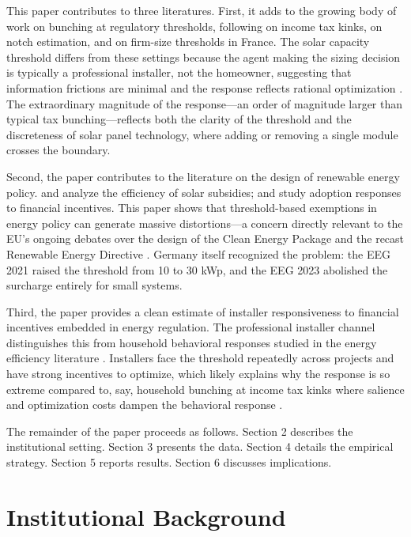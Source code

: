 \documentclass[12pt]{article}
\begin{document}
This paper contributes to three literatures. First, it adds to the growing body of work on bunching at regulatory thresholds, following \citet{saez2010taxpayers} on income tax kinks, \citet{kleven2013using} on notch estimation, and \citet{garicano2016firm} on firm-size thresholds in France. The solar capacity threshold differs from these settings because the agent making the sizing decision is typically a professional installer, not the homeowner, suggesting that information frictions are minimal and the response reflects rational optimization \citep{chetty2011adjustment}. The extraordinary magnitude of the response---an order of magnitude larger than typical tax bunching---reflects both the clarity of the threshold and the discreteness of solar panel technology, where adding or removing a single module crosses the boundary.

Second, the paper contributes to the literature on the design of renewable energy policy. \citet{borenstein2012private} and \citet{hughes2015policy} analyze the efficiency of solar subsidies; \citet{crago2017solar} and \citet{gillingham2016cost} study adoption responses to financial incentives. This paper shows that threshold-based exemptions in energy policy can generate massive distortions---a concern directly relevant to the EU's ongoing debates over the design of the Clean Energy Package and the recast Renewable Energy Directive \citep{eu2018red2}. Germany itself recognized the problem: the EEG 2021 raised the threshold from 10 to 30 kWp, and the EEG 2023 abolished the surcharge entirely for small systems.

Third, the paper provides a clean estimate of installer responsiveness to financial incentives embedded in energy regulation. The professional installer channel distinguishes this from household behavioral responses studied in the energy efficiency literature \citep{allcott2014short, ito2014moral}. Installers face the threshold repeatedly across projects and have strong incentives to optimize, which likely explains why the response is so extreme compared to, say, household bunching at income tax kinks where salience and optimization costs dampen the behavioral response \citep{kleven2016bunching}.

The remainder of the paper proceeds as follows. Section 2 describes the institutional setting. Section 3 presents the data. Section 4 details the empirical strategy. Section 5 reports results. Section 6 discusses implications.


\section{Institutional Background}
\end{document}
